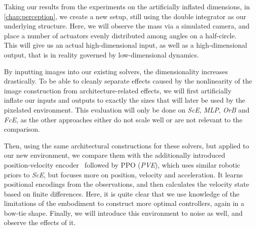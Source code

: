 Taking our results from the experiments on the artificially inflated dimensions, in \cref{chap:perception}, we create a new setup, still using the double
integrator as our underlying structure. Here, we will observe the mass via a simulated camera, and place a number of actuators
evenly distributed among angles on a half-circle. This will give us an actual high-dimensional input, as well as a high-dimensional
output, that is in reality governed by low-dimensional dynamics.

By inputting images into our existing solvers, the dimensionality increases drastically. To be able to cleanly separate effects caused
by the nonlinearity of the image construction from architecture-related effects, we will first artificially inflate our inputs and outputs 
to exactly the sizes that will later be used by the pixelated environment. This evaluation will only be done on \emph{ScE},
\emph{MLP}, \emph{OrB} and \emph{FcE}, as the other approaches either do not scale well or are not relevant to the comparison.

Then, using the same architectural constructions for these solvers, but applied to our new environment,
we compare them with the additionally introduced position-velocity encoder~\cite{Jonschkowski2017PVE} followed by PPO (\emph{PVE}),
which uses similar robotic priors to \emph{ScE}, but focuses
more on position, velocity and acceleration. It learns positional encodings from the observations, and then calculates the velocity state based
on finite differences. Here, it is quite clear that we use knowledge of the limitations of the embodiment to construct more optimal controllers,
again in a bow-tie shape. Finally, we will introduce this environment to noise as well, and observe the effects of it.